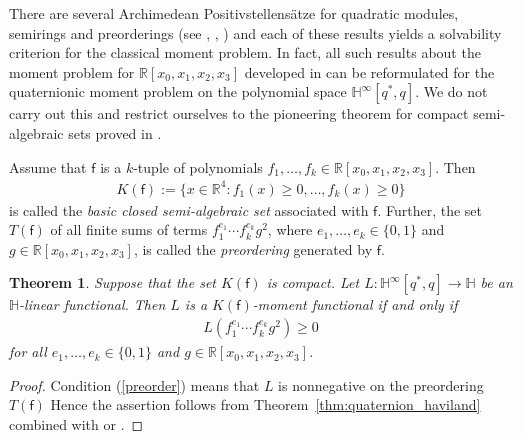 \documentclass[11pt,a4paper]{amsart}
\newtheorem{theorem}{Theorem}[section]
\theoremstyle{definition}
\begin{document}
There are several Archimedean Positivstellens\"atze for quadratic modules,
semirings and preorderings (see \cite{Marshall2008},
\cite{Schmudgen2017}, \cite{Scheiderer2024}) and each of these results
yields a solvability criterion for the classical moment problem. In fact,
all such results about the moment problem for
$\mathbb{R}[x_{0},x_{1},x_{2},x_{3}]$ developed in
\cite[Chapter 12]{Schmudgen2017} can be reformulated for the quaternionic
moment problem on the polynomial space
$\mathbb{H}^{\infty}[q^{*}, q]$. We do not carry out this and restrict
ourselves to the pioneering theorem for compact semi-algebraic sets proved
in \cite{Schmudgen1991}.

Assume that $\mathsf{{f}}$ is a $k$-tuple of polynomials
$f_{1},\dots ,f_{k}\in \mathbb{R}[x_{0},x_{1},x_{2},x_{3}]$. Then
%
\begin{align}
\label{defsemialgebraicset}
K({\mathsf{f}}):=\{x\in \mathbb{R}^{4}: f_{1}(x)\geq 0,\dots ,f_{k}(x)
\geq 0\}
\end{align}
%
is called the \emph{basic closed semi-algebraic set} associated with
$\mathsf{f}$. Further, the set $T({\mathsf{f}})$ of all finite sums of terms
$ f_{1}^{e_{1}}\cdots f_{k}^{e_{k}}g^{2}$, where
$ e_{1},\dots ,e_{k}\in \{0,1\}$ and
$g\in \mathbb{R}[x_{0},x_{1},x_{2},x_{3}]$, is called the
\emph{preordering} generated by $\mathsf{f}$.
%
\begin{theorem}%
\label{mpppreordering}
Suppose that the set $K({\mathsf{f}})$ is compact. Let
$L:\mathbb{H}^{\infty}[q^{*}, q]\to \mathbb{H}$ be an $\mathbb{H}$-linear
functional. Then $L$ is a $K({\mathsf{f}})$-moment functional if and only if
%
\begin{align}
\label{preorder}
L( f_{1}^{e_{1}}\cdots f_{k}^{e_{k}}g^{2})\geq 0
\end{align}
%
for all $ e_{1},\dots ,e_{k}\in \{0,1\}$ and
$g\in \mathbb{R}[x_{0},x_{1},x_{2},x_{3}]$.
\end{theorem}
%
\begin{proof}
Condition (\ref{preorder}) means that $L$ is nonnegative on the preordering
$T({\mathsf{f}})$ Hence the assertion follows from Theorem~\ref{thm:quaternion_haviland} combined with
\cite[Theorem 1]{Schmudgen1991} or
\cite[Theorem 12.25]{Schmudgen2017}.
\end{proof}
\end{document}
